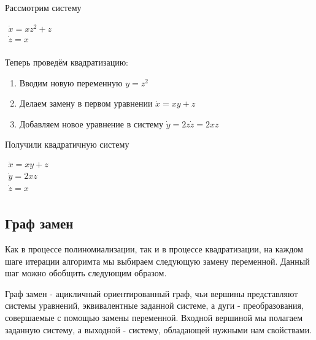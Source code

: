 \begin{example}
    Рассмотрим систему

    $\begin{array}{lcl}
        \dot x = xz^2 + z \\
        \dot z = x \\
    \end{array}$
    \newline
    
    Теперь проведём квадратизацию:
    \begin{enumerate}
        \item Вводим новую переменную $y = z^2$
        \item Делаем замену в первом уравнении $\dot x = xy + z$
        \item Добавляем новое уравнение в систему $\dot y = 2z \dot z = 2xz$
    \end{enumerate}
    
     Получили квадратичную систему
    
    $\begin{array}{lcl}
        \dot x = xy + z \\
        \dot y = 2xz \\
        \dot z = x \\
    \end{array}$
\end{example}




\subsection{Граф замен} \label{replacement-graph-section}

Как в процессе полиномиализации, так и в процессе квадратизации, на каждом шаге итерации алгоримта мы выбираем следующую замену переменной. Данный шаг можно обобщить следующим образом.

Граф замен - ацикличный ориентированный граф, чьи вершины представляют системы уравнений, эквивалентные заданной системе, а дуги - преобразования, совершаемые с помощью замены переменной. Входной вершиной мы полагаем заданную систему, а выходной - систему, обладающей нужными нам свойствами.

